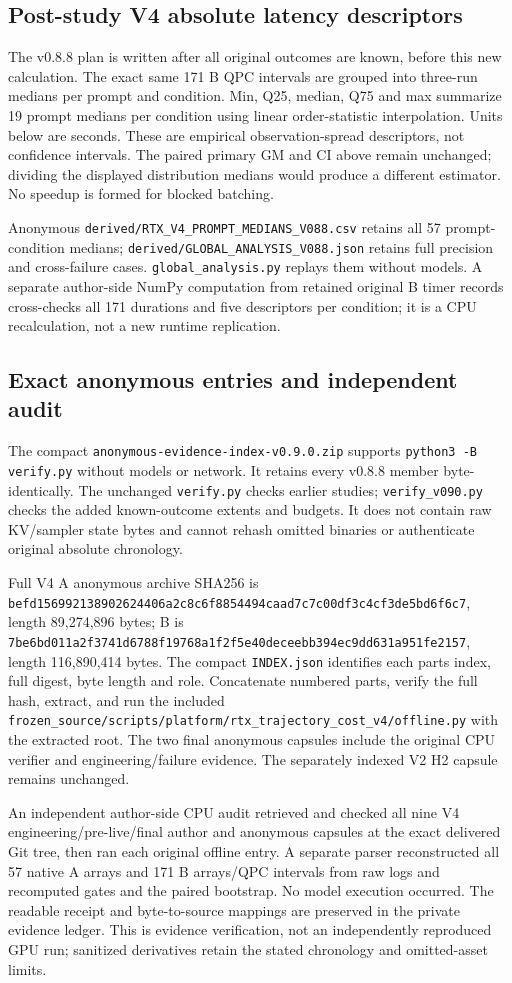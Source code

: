 \subsection{Post-study V4 absolute latency descriptors}
The v0.8.8 plan is written after all original outcomes are known, before this new calculation. The exact same 171 B QPC intervals are grouped into three-run medians per prompt and condition. Min, Q25, median, Q75 and max summarize 19 prompt medians per condition using linear order-statistic interpolation. Units below are seconds. These are empirical observation-spread descriptors, not confidence intervals. The paired primary GM and CI above remain unchanged; dividing the displayed distribution medians would produce a different estimator. No speedup is formed for blocked batching.

Anonymous \nolinkurl{derived/RTX_V4_PROMPT_MEDIANS_V088.csv} retains all 57 prompt-condition medians; \nolinkurl{derived/GLOBAL_ANALYSIS_V088.json} retains full precision and cross-failure cases. \nolinkurl{global_analysis.py} replays them without models. A separate author-side NumPy computation from retained original B timer records cross-checks all 171 durations and five descriptors per condition; it is a CPU recalculation, not a new runtime replication.

\subsection{Exact anonymous entries and independent audit}
The compact \nolinkurl{anonymous-evidence-index-v0.9.0.zip} supports \texttt{python3 -B verify.py} without models or network. It retains every v0.8.8 member byte-identically. The unchanged \texttt{verify.py} checks earlier studies; \texttt{verify\_v090.py} checks the added known-outcome extents and budgets. It does not contain raw KV/sampler state bytes and cannot rehash omitted binaries or authenticate original absolute chronology.

Full V4 A anonymous archive SHA256 is \nolinkurl{befd156992138902624406a2c8c6f8854494caad7c7c00df3c4cf3de5bd6f6c7}, length 89,274,896 bytes; B is \nolinkurl{7be6bd011a2f3741d6788f19768a1f2f5e40deceebb394ec9dd631a951fe2157}, length 116,890,414 bytes. The compact \texttt{INDEX.json} identifies each parts index, full digest, byte length and role. Concatenate numbered parts, verify the full hash, extract, and run the included \nolinkurl{frozen_source/scripts/platform/rtx_trajectory_cost_v4/offline.py} with the extracted root. The two final anonymous capsules include the original CPU verifier and engineering/failure evidence. The separately indexed V2 H2 capsule remains unchanged.

An independent author-side CPU audit retrieved and checked all nine V4 engineering/pre-live/final author and anonymous capsules at the exact delivered Git tree, then ran each original offline entry. A separate parser reconstructed all 57 native A arrays and 171 B arrays/QPC intervals from raw logs and recomputed gates and the paired bootstrap. No model execution occurred. The readable receipt and byte-to-source mappings are preserved in the private evidence ledger. This is evidence verification, not an independently reproduced GPU run; sanitized derivatives retain the stated chronology and omitted-asset limits.

